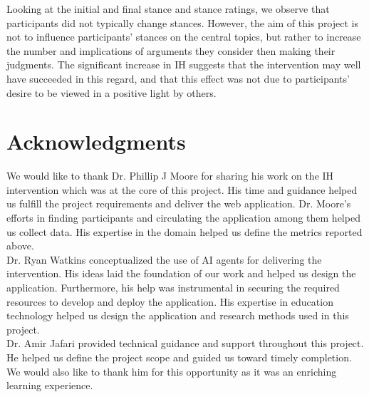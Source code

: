 \documentclass{scrartcl}
\begin{document}
Looking at the initial and final stance and stance ratings, we observe that participants did not typically change stances. However, the aim of this project is not to influence participants' stances on the central topics, but rather to increase the number and implications of arguments they consider then making their judgments. The significant increase in IH suggests that the intervention may well have succeeded in this regard, and that this effect was not due to participants' desire to be viewed in a positive light by others.

\section{Acknowledgments}
We would like to thank Dr. Phillip J Moore for sharing his work on the IH intervention which was at the core of this project. His time and guidance helped us fulfill the project requirements and deliver the web application. Dr. Moore's efforts in finding participants and circulating the application among them helped us collect data. His expertise in the domain helped us define the metrics reported above.\\
Dr. Ryan Watkins conceptualized the use of AI agents for delivering the intervention. His ideas laid the foundation of our work and helped us design the application. Furthermore, his help was instrumental in securing the required resources to develop and deploy the application. His expertise in education technology helped us design the application and research methods used in this project.\\
Dr. Amir Jafari provided technical guidance and support throughout this project. He helped us define the project scope and guided us toward timely completion. We would also like to thank him for this opportunity as it was an enriching learning experience.



\end{document}
